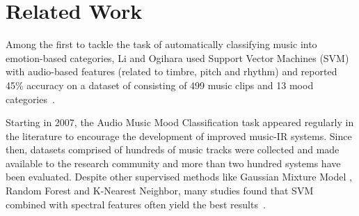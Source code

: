 \documentclass{llncs}
\begin{document}
\section{Related Work}

Among the first to tackle the task of automatically classifying music into emotion-based categories, Li and Ogihara used Support Vector Machines (SVM) with audio-based features (related to timbre, pitch and rhythm) and reported 45\% accuracy on a dataset of consisting of 499 music clips and 13 mood categories~\cite{DBLP:conf/ismir/LiM03}.



Starting in 2007, the Audio Music Mood Classification task appeared regularly in the literature to encourage the development of improved music-IR systems. Since then, datasets comprised of hundreds of music tracks were collected and made available to the research community and more than two hundred systems have been evaluated. Despite other supervised methods like Gaussian Mixture Model \cite{DBLP:journals/taslp/LuLZ06}, Random Forest and K-Nearest Neighbor, many studies found that SVM combined with spectral features often yield the best results~\cite{Yang2012Machine}.

\end{document}
